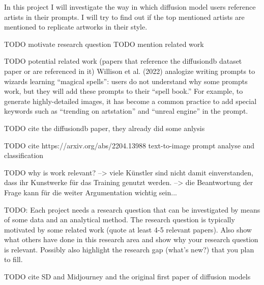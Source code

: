 In this project I will investigate the way in which diffusion model users reference artists in their prompts. I will try to find out if the top mentioned artists are mentioned to replicate artworks in their style. %

TODO motivate research question
TODO mention related work

TODO potential related work (papers that reference the diffusiondb dataset paper or are referenced in it)
Willison et al. (2022) analogize writing prompts to wizards learning “magical spells”: users do not understand why some prompts work, but they will add these prompts to their “spell book.” For example, to generate highly-detailed images, it has become a common practice to add special keywords such as “trending on artstation” and “unreal engine” in the prompt.

TODO cite the diffusiondb paper, they already did some anlysis

TODO cite https://arxiv.org/abs/2204.13988 text-to-image prompt analyse and classification

TODO why is work relevant? 
--> viele Künstler sind nicht damit einverstanden, dass ihr Kunstwerke für das Training genutzt werden.
--> die Beantwortung der Frage kann für die weiter Argumentation wichtig sein...  



TODO:
Each project needs a research question that can be
investigated by means of some data and an analytical
method. The research question is typically motivated by
some related work (quote at least 4-5 relevant papers).
Also show what others have done in this research area
and show why your research question is relevant. Possibly
also highlight the research gap (what’s new?) that you plan
to fill.


TODO cite SD and Midjourney and the original first paper of diffusion models

